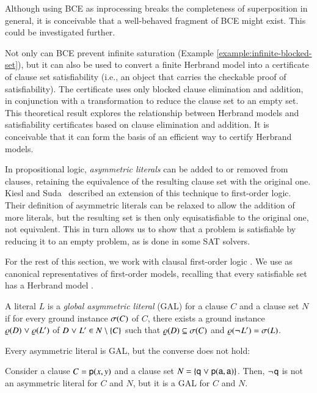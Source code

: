 Although using BCE as inprocessing breaks the completeness of superposition in
general, it is conceivable that a well-behaved fragment of BCE might exist.
This could be investigated further.

   
Not only can BCE prevent infinite saturation (Example \ref{example:infinite-blocked-set}),
but it can also be used to convert a finite Herbrand model
into a certificate of clause set satisfiability (i.e., an object that carries the checkable proof of satisfiability). The certificate uses only
blocked clause elimination and addition, in conjunction with a transformation
to reduce the clause set to an empty set. This theoretical result
explores the relationship between Herbrand models and satisfiability certificates
based on clause elimination and addition. It is conceivable that it can form
the basis of an efficient way to certify Herbrand models.


In propositional logic, \emph{asymmetric literals} can be added to
or removed from clauses, retaining the equivalence of the resulting clause set with
the original one. Kiesl and Suda~\cite{ks-2017-unif-principle} described an extension of
this technique to first-order logic.
Their definition of asymmetric literals can be relaxed to
allow the addition of more literals, but the resulting set is then only
equisatisfiable to the original one, not equivalent.
This in turn allows us to show that a problem is satisfiable by
reducing it to an empty problem, as is done in some SAT solvers.

For the rest of this section, we work with clausal first-order logic
. We use  as canonical
representatives of first-order models, recalling that every
satisfiable set has a Herbrand model \cite[Sect.~5.4]{mf-1996-fol}.

\begin{defi}
   A literal $L$ is a \emph{global asymmetric literal} (GAL) for a clause $C$
   and a clause set $N$ if for every ground instance $\sigma(C)$ of $C$, there
   exists a ground instance $\varrho(D) \mathrel{\lor} \varrho(L')$ of $D \mathrel{\lor} L' \in N \setminus \{C\}$ such that $\varrho(D)
   \subseteq \sigma(C)$ and $\varrho(\neg{\kern.2ex L}') = \sigma(L)$.
 \end{defi}
\confrep{}{}

Every asymmetric literal is GAL, but the converse does not hold:

\begin{exa}
   Consider a clause $C = {\mathsf{p}(x,y)}$ and a clause set $N = \{{\mathsf{q}} \mathrel{\lor}
  {\mathsf{p}(\mathsf{a},\mathsf{a})}\}$. Then, $\neg{\kern.2ex \mathsf{q}}$ is not an asymmetric literal
  for $C$ and $N$, but it is a GAL for $C$ and $N$.
\end{exa}

